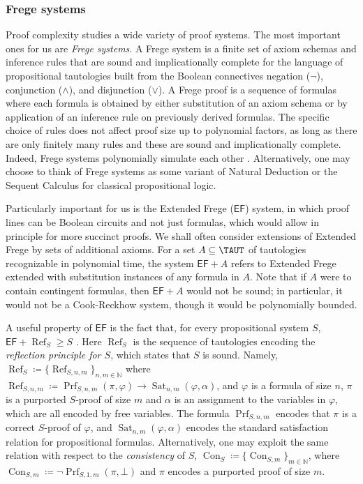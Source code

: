 \documentclass[11pt]{article}
\newcommand{\EF}{\mathsf{EF}}
\theoremstyle{definition}
\theoremstyle{plain}
\theoremstyle{remark}
\let\autocite\cite
\begin{document}
\subsubsection{Frege systems}
\label{subsec:proof-complexity-ref}
Proof complexity studies a wide variety of proof systems. The most important ones for us are \emph{Frege systems}. A Frege system is a finite set of axiom schemas and inference rules that are sound and implicationally complete for the language of propositional tautologies built from the Boolean connectives negation ($\neg$), conjunction ($\land$), and disjunction ($\lor$). A Frege proof is a sequence of formulas where each formula is obtained by either substitution of an axiom schema or by application of an inference rule on previously derived formulas. The specific choice of rules does not affect proof size up to polynomial factors, as long as there are only finitely many rules and these are sound and implicationally complete. Indeed, Frege systems polynomially simulate each other \autocite[Thm. 4.4.13]{krajicekBOOK}. Alternatively, one may choose to think of Frege systems as some variant of Natural Deduction or the Sequent Calculus for classical propositional logic.

Particularly important for us is the Extended Frege ($\EF$) system, in which proof lines can be Boolean circuits and not just formulas, which would allow in principle for more succinct proofs. We shall often consider extensions of Extended Frege by sets of additional axioms. For a set $A \subseteq \TAUT$ of tautologies recognizable in polynomial time, the system $\EF + A$ refers to Extended Frege extended with substitution instances of any formula in $A$. Note that if $A$ were to contain contingent formulas, then $\EF + A$ would not be sound; in particular, it would not be a Cook-Reckhow system, though it would be polynomially bounded.

A useful property of $\EF$ is the fact that, for every propositional system $S$, $\EF + \operatorname{Ref}_S \geq S$ \cite{KP90}. Here $\operatorname{Ref}_S$ is the sequence of tautologies encoding the \emph{reflection principle for $S$}, which states that $S$ is sound. Namely, $\operatorname{Ref}_S \coloneqq \{\operatorname{Ref}_{S, n, m}\}_{n, m \in \mathbb{N}}$ where
$\operatorname{Ref}_{S, {n, m}} \coloneqq \operatorname{Prf}_{S, n, m}(\pi, \varphi) \to \operatorname{Sat}_{n, m}(\varphi, \alpha)$,
and $\varphi$ is a formula of size $n$, $\pi$ is a purported $S$-proof of size $m$ and $\alpha$ is an assignment to the variables in $\varphi$, which are all encoded by free variables. The formula $\operatorname{Prf}_{S, n, m}$ encodes that $\pi$ is a correct $S$-proof of $\varphi$, and $\operatorname{Sat}_{n, m}(\varphi, \alpha)$ encodes the standard satisfaction relation for propositional formulas. Alternatively, one may exploit the same relation with respect to the \emph{consistency} of $S$, $\operatorname{Con}_S \coloneqq \{\operatorname{Con}_{S, m}\}_{m \in \mathbb{N}}$, where $\operatorname{Con}_{S, m} \coloneqq \neg \operatorname{Prf}_{S,1, m}(\pi, \bot)$ and $\pi$ encodes a purported proof of size $m$.
\end{document}

